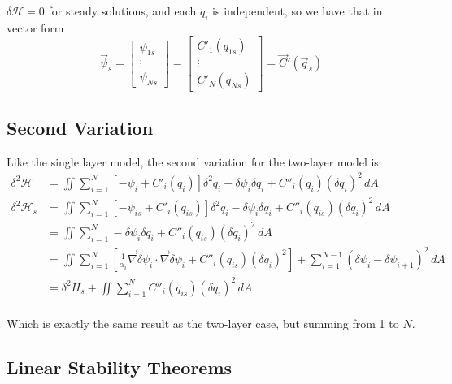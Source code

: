 \documentclass[12pt]{article}
\begin{document}
    $\delta \mathcal{H} = 0$ for steady solutions, and each $q_i$ is independent, so we have that in vector form
    \begin{equation}
      \vec \psi_s = 
      \left[\begin{array}{c}
        \psi_{1s} \\
        \vdots \\
        \psi_{Ns}
      \end{array}\right]
      =
      \left[\begin{array}{c}
        C'_1(q_{1s}) \\
        \vdots \\
        C'_N(q_{Ns})
      \end{array}\right]
      =
      \vec C'(\vec q_s)
    \end{equation}

  \subsection{Second Variation}
    Like the single layer model, the second variation for the two-layer model is
    \begin{align*}
      \delta^2 \mathcal{H} &= \iint \sum_{i=1}^N \left[ - \psi_i + C'_i(q_i) \right]  \delta^2 q_i  - \delta \psi_i \delta q_i +  C''_i(q_i) (\delta q_i)^2  \, dA \\
      \delta^2 \mathcal{H}_s &= \iint \sum_{i=1}^N \left[ - \psi_{is} + C'_i(q_{is}) \right]  \delta^2 q_i  - \delta \psi_i \delta q_i +  C''_i(q_{is}) (\delta q_i)^2  \, dA \\
       &= \iint \sum_{i=1}^N - \delta \psi_i \delta q_i +  C''_i(q_{is}) (\delta q_i)^2  \, dA \\
       &= \iint \sum_{i=1}^N \left[ \frac{1}{\alpha_i} \vec\nabla\delta\psi_i \cdot \vec\nabla\delta\psi_i + C''_i(q_{is}) (\delta q_i)^2 \right] + \sum_{i=1}^{N-1}(\delta\psi_i - \delta\psi_{i+1})^2 \, dA \\
       &= \delta^2 H_s + \iint \sum_{i=1}^N C''_i(q_{is})(\delta q_i)^2 \, dA \\
    \end{align*}

    Which is exactly the same result as the two-layer case, but summing from 1 to $N$.

  \subsection{Linear Stability Theorems}
\end{document}
